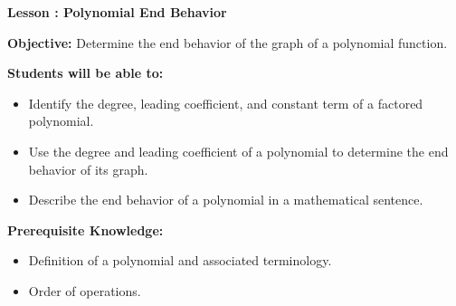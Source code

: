 \documentclass[12pt]{article}
\theoremstyle{definition}
\begin{document}
{\bf \large Lesson : Polynomial End Behavior}
\hfill \doclicenseImage[imagewidth=5em]\\
\par
{\bf Objective:} Determine the end behavior of the graph of a polynomial function.\\
\par
{\bf Students will be able to:}
\begin{itemize}
	\item Identify the degree, leading coefficient, and constant term of a factored polynomial.
	\item Use the degree and leading coefficient of a polynomial to determine the end behavior of its graph.
	\item Describe the end behavior of a polynomial in a mathematical sentence.
\end{itemize}
{\bf Prerequisite Knowledge:}
\begin{itemize}
	\item Definition of a polynomial and associated terminology.
	\item Order of operations.
\end{itemize}
\hrulefill
\end{document}
